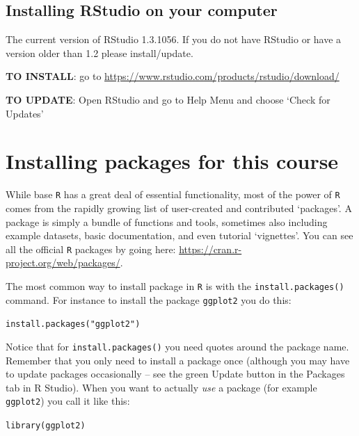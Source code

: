 \documentclass[
]{book}
\newcommand{\passthrough}[1]{#1}
\begin{document}
\hypertarget{installing-rstudio-on-your-computer}{%
\section*{Installing RStudio on your computer}\label{installing-rstudio-on-your-computer}}

The current version of RStudio 1.3.1056. If you do not have RStudio or have a version older than 1.2 please install/update.

\textbf{TO INSTALL}: go to \url{https://www.rstudio.com/products/rstudio/download/}

\textbf{TO UPDATE}: Open RStudio and go to Help Menu and choose `Check for Updates'

\hypertarget{installing-packages-for-this-course}{%
\chapter*{Installing packages for this course}\label{installing-packages-for-this-course}}

While base \passthrough{\lstinline!R!} has a great deal of essential functionality, most of the power of \passthrough{\lstinline!R!} comes from the rapidly growing list of user-created and contributed `packages'. A package is simply a bundle of functions and tools, sometimes also including example datasets, basic documentation, and even tutorial `vignettes'. You can see all the official \passthrough{\lstinline!R!} packages by going here: \url{https://cran.r-project.org/web/packages/}.

The most common way to install package in \passthrough{\lstinline!R!} is with the \passthrough{\lstinline!install.packages()!} command. For instance to install the package \passthrough{\lstinline!ggplot2!} you do this:

\passthrough{\lstinline!install.packages("ggplot2")!}

Notice that for \passthrough{\lstinline!install.packages()!} you need quotes around the package name. Remember that you only need to install a package once (although you may have to update packages occasionally -- see the green Update button in the Packages tab in R Studio). When you want to actually \emph{use} a package (for example \passthrough{\lstinline!ggplot2!}) you call it like this:

\passthrough{\lstinline!library(ggplot2)!}
\end{document}
